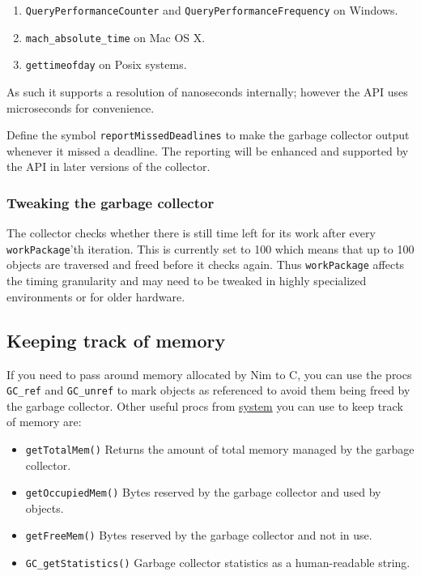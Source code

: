 \begin{enumerate}
\def\labelenumi{\arabic{enumi})}
\tightlist
\item
  \texttt{QueryPerformanceCounter} and
  \texttt{QueryPerformanceFrequency} on Windows.
\item
  \texttt{mach\_absolute\_time} on Mac OS X.
\item
  \texttt{gettimeofday} on Posix systems.
\end{enumerate}

As such it supports a resolution of nanoseconds internally; however the
API uses microseconds for convenience.

Define the symbol \texttt{reportMissedDeadlines} to make the garbage
collector output whenever it missed a deadline. The reporting will be
enhanced and supported by the API in later versions of the collector.

\hypertarget{tweaking-the-garbage-collector}{%
\subsubsection{Tweaking the garbage
collector}\label{tweaking-the-garbage-collector}}

The collector checks whether there is still time left for its work after
every \texttt{workPackage}'th iteration. This is currently set to 100
which means that up to 100 objects are traversed and freed before it
checks again. Thus \texttt{workPackage} affects the timing granularity
and may need to be tweaked in highly specialized environments or for
older hardware.

\hypertarget{keeping-track-of-memory}{%
\subsection{Keeping track of memory}\label{keeping-track-of-memory}}

If you need to pass around memory allocated by Nim to C, you can use the
procs \texttt{GC\_ref} and \texttt{GC\_unref} to mark objects as
referenced to avoid them being freed by the garbage collector. Other
useful procs from \href{system.html}{system} you can use to keep track
of memory are:

\begin{itemize}
\tightlist
\item
  \texttt{getTotalMem()} Returns the amount of total memory managed by
  the garbage collector.
\item
  \texttt{getOccupiedMem()} Bytes reserved by the garbage collector and
  used by objects.
\item
  \texttt{getFreeMem()} Bytes reserved by the garbage collector and not
  in use.
\item
  \texttt{GC\_getStatistics()} Garbage collector statistics as a
  human-readable string.
\end{itemize}

